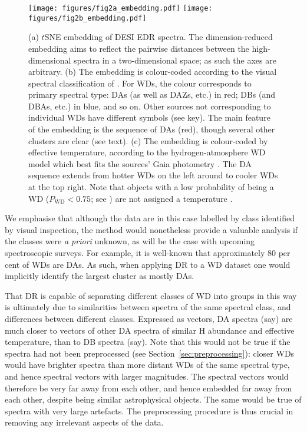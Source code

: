 \documentclass[fleqn,usenatbib]{mnras}
\begin{document}
\begin{figure*}
    \centering
\texttt{[image: figures/fig2a\_embedding.pdf]}
\texttt{[image: figures/fig2b\_embedding.pdf]}
\caption{
    (a) $t$SNE embedding of DESI EDR spectra.
    The dimension-reduced embedding aims to reflect the pairwise distances between the high-dimensional spectra in a two-dimensional space; as such the axes are arbitrary.
    (b) The embedding is colour-coded according to the visual spectral classification of \citet{manser24}.
    For WDs, the colour corresponds to primary spectral type: DAs (as well as DAZs, etc.) in red; DBs (and DBAs, etc.) in blue, and so on.
    Other sources not corresponding to individual WDs have different symbols (see key).
    The main feature of the embedding is the sequence of DAs (red), though several other clusters are clear (see text).
    (c) The embedding is colour-coded by effective temperature, according to the hydrogen-atmosphere WD model which best fits the sources' Gaia photometry \citep{gentilefusillo19}.
    The DA sequence extends from hotter WDs on the left around to cooler WDs at the top right.
    Note that objects with a low probability of being a WD ($P_\mathrm{WD} < 0.75$; see \citealt{gentilefusillo15}) are not assigned a temperature \citep{gentilefusillo19}.
}
\label{fig:full_spectra}
\end{figure*}

We emphasise that although the data are in this case labelled by class identified by visual inspection, the method would nonetheless provide a valuable analysis if the classes were \textit{a priori} unknown, as will be the case with upcoming spectroscopic surveys.
For example, it is well-known that approximately 80 per cent of WDs are DAs.
As such, when applying DR to a WD dataset one would implicitly identify the largest cluster as mostly DAs.

That DR is capable of separating different classes of WD into groups in this way is ultimately due to similarities between spectra of the same spectral class, and differences between different classes.
Expressed as vectors, DA spectra (say) are much closer to vectors of other DA spectra of similar H abundance and effective temperature, than to DB spectra (say).
Note that this would not be true if the spectra had not been preprocessed (see Section~\ref{sec:preprocessing}): closer WDs would have brighter spectra than more distant WDs of the same spectral type, and hence spectral vectors with larger magnitudes.
The spectral vectors would therefore be very far away from each other, and hence embedded far away from each other, despite being similar astrophysical objects.
The same would be true of spectra with very large artefacts.
The preprocessing procedure is thus crucial in removing any irrelevant aspects of the data.
\end{document}
